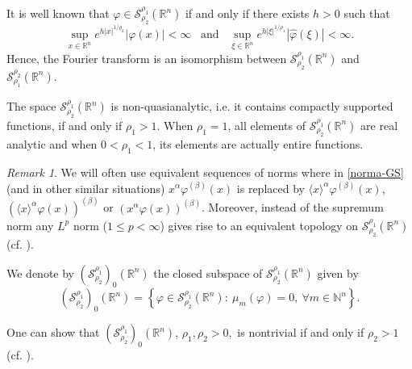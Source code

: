 \documentclass[reqno,12pt]{amsart}
\theoremstyle{plain}
\theoremstyle{definition}
\theoremstyle{remark}
\newtheorem{remark}{Remark}
\begin{document}
It is well known \cite{chchki96} that $\varphi \in \mathcal{S}_{{\rho_2} } ^{{\rho_1}}
(\mathbb{R}^n) $ if and only if there exists $h>0$ such
that
$$
\sup_{x\in\mathbb{R}^{n}}  e^{h|x|^{1/{\rho_2}}} | \varphi (x)| <\infty \;\;\; \mbox{and}
\;\;\; \sup_{\xi\in\mathbb{R}^{n}}    e^{h|\xi|^{1/{\rho_1}}} | \hat \varphi (\xi)|<\infty.
$$
Hence, the Fourier transform is an isomorphism between
$ \mathcal{S}_{{\rho_2}}^{{\rho_1}} (\mathbb{R}^n) $
and $ \mathcal{S} ^{{\rho_2}} _{{\rho_1}} (\mathbb{R}^n). $

\par

The space $ \mathcal{S}_{{\rho_2}}^{{\rho_1}} (\mathbb{R}^n) $ is non-quasianalytic, i.e. it contains compactly supported functions, if and only if $\rho_1>1$. When $\rho_1=1$, all elements of $ \mathcal{S}_{{\rho_2}}^{{\rho_1}} (\mathbb{R}^n) $ are real analytic and when $0<\rho_1<1$, its elements are actually entire functions.

\par

\begin{remark} \label{remark equivalent sequences}
We will often use equivalent sequences of norms where in
\eqref{norma-GS} (and in other similar situations)
$ x^{\alpha}\varphi^{(\beta)} (x)$
is replaced by $ \langle x \rangle^{\alpha}\varphi^{(\beta)} (x)$,
 $ (\langle x \rangle^{\alpha}\varphi (x))^{(\beta)} $
or $ (x^{\alpha}\varphi (x))^{(\beta)} $. Moreover, instead of the supremum norm any $L^p$ norm ($1\leq p<\infty$)
gives rise to an equivalent topology on $ \mathcal{S}_{{\rho_2}}^{{\rho_1}} (\mathbb{R}^n) $ (cf. \cite[Ch 2.5]{CKP}).
\end{remark}

\par

We denote by $ (\mathcal{S}_{{\rho_2} } ^{{\rho_1}})_0 (\mathbb{R}^n) $ the closed subspace of
$ \mathcal{S}_{{\rho_2}}^{{\rho_1}} (\mathbb{R}^n)$ given by
$$
(\mathcal{S}_{{\rho_2} }^{{\rho_1}})_0
(\mathbb{R}^n)=\left\{\varphi \in \mathcal{S}_{{\rho_2}}^{{\rho_1}}
(\mathbb{R}^n): \: {\mu}_m (\varphi) = 0,\ \forall m \in
\mathbb{N}^{n} \right\}.
$$

\par

One can show that $ (\mathcal{S}_{{\rho_2}}^{{\rho_1}})_0 (\mathbb{R}^n) $, $ {\rho_1}, {\rho_2} > 0,$ is
nontrivial if and only if $ {\rho_2} > 1 $ (cf. \cite{GS}).

\par
\end{document}
